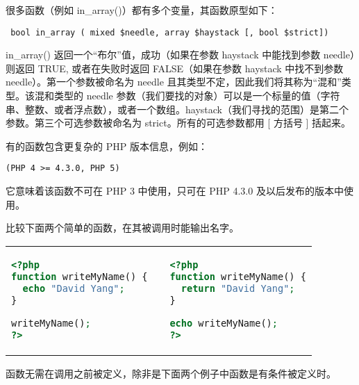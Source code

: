 很多函数（例如 in\_array()）都有多个变量，其函数原型如下：

\begin{verbatim}
 bool in_array ( mixed $needle, array $haystack [, bool $strict])
\end{verbatim}

in\_array() 返回一个“布尔”值，成功（如果在参数 haystack 中能找到参数 needle）则返回 TRUE, 或者在失败时返回 FALSE（如果在参数 haystack 中找不到参数 needle）。第一个参数被命名为 needle 且其类型不定，因此我们将其称为“混和”类型。该混和类型的 needle 参数（我们要找的对象）可以是一个标量的值（字符串、整数、或者浮点数），或者一个数组。haystack（我们寻找的范围）是第二个参数。第三个可选参数被命名为 strict。所有的可选参数都用 [ 方括号 ] 括起来。


有的函数包含更复杂的 PHP 版本信息，例如：

\begin{verbatim}
(PHP 4 >= 4.3.0, PHP 5)
\end{verbatim}

它意味着该函数不可在 PHP 3 中使用，只可在 PHP 4.3.0 及以后发布的版本中使用。






比较下面两个简单的函数，在其被调用时能输出名字。


\begin{tabular}{m{180pt}m{5pt}m{180pt}}
\begin{lstlisting}[language=PHP]
<?php
function writeMyName() {
  echo "David Yang";
}

writeMyName();
?>
\end{lstlisting} && 
\begin{lstlisting}[language=PHP]
<?php
function writeMyName() {
  return "David Yang";
}

echo writeMyName();
?>
\end{lstlisting}\\
\end{tabular}



函数无需在调用之前被定义，除非是下面两个例子中函数是有条件被定义时。

